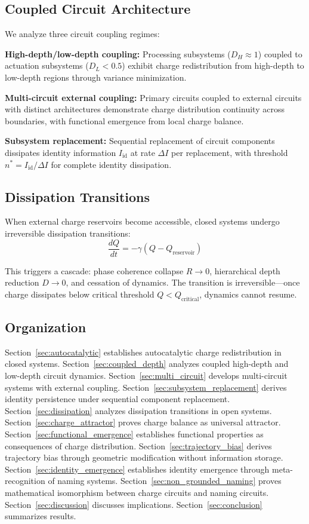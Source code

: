 \documentclass[12pt,a4paper]{article}
\theoremstyle{plain}
\theoremstyle{definition}
\theoremstyle{remark}
\begin{document}
\subsection{Coupled Circuit Architecture}

We analyze three circuit coupling regimes:

\textbf{High-depth/low-depth coupling:} Processing subsystems ($D_H \approx 1$) coupled to actuation subsystems ($D_L < 0.5$) exhibit charge redistribution from high-depth to low-depth regions through variance minimization.

\textbf{Multi-circuit external coupling:} Primary circuits coupled to external circuits with distinct architectures demonstrate charge distribution continuity across boundaries, with functional emergence from local charge balance.

\textbf{Subsystem replacement:} Sequential replacement of circuit components dissipates identity information $I_{\text{id}}$ at rate $\Delta I$ per replacement, with threshold $n^* = I_{\text{id}} / \Delta I$ for complete identity dissipation.

\subsection{Dissipation Transitions}

When external charge reservoirs become accessible, closed systems undergo irreversible dissipation transitions:
\begin{equation}
\frac{dQ}{dt} = -\gamma (Q - Q_{\text{reservoir}})
\end{equation}

This triggers a cascade: phase coherence collapse $R \to 0$, hierarchical depth reduction $D \to 0$, and cessation of dynamics. The transition is irreversible—once charge dissipates below critical threshold $Q < Q_{\text{critical}}$, dynamics cannot resume.

\subsection{Organization}

Section~\ref{sec:autocatalytic} establishes autocatalytic charge redistribution in closed systems. Section~\ref{sec:coupled_depth} analyzes coupled high-depth and low-depth circuit dynamics. Section~\ref{sec:multi_circuit} develops multi-circuit systems with external coupling. Section~\ref{sec:subsystem_replacement} derives identity persistence under sequential component replacement. Section~\ref{sec:dissipation} analyzes dissipation transitions in open systems. Section~\ref{sec:charge_attractor} proves charge balance as universal attractor. Section~\ref{sec:functional_emergence} establishes functional properties as consequences of charge distribution. Section~\ref{sec:trajectory_bias} derives trajectory bias through geometric modification without information storage. Section~\ref{sec:identity_emergence} establishes identity emergence through meta-recognition of naming systems. Section~\ref{sec:non_grounded_naming} proves mathematical isomorphism between charge circuits and naming circuits. Section~\ref{sec:discussion} discusses implications. Section~\ref{sec:conclusion} summarizes results.
\end{document}
